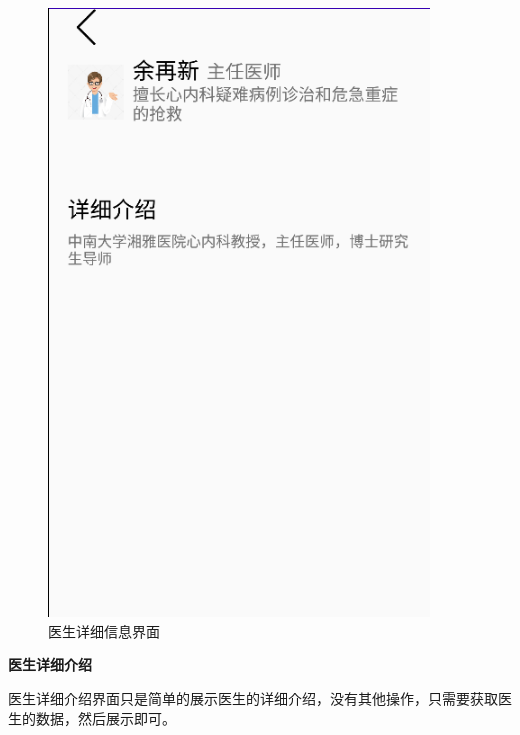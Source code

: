 \documentclass[UTF8,12pt]{article}
\begin{document}
\begin{figure}[htbp]
\begin{minipage}[t]{0.45\textwidth}
        \includegraphics[width=0.9\textwidth]{imgs/23.png}
        \caption{医生详细信息界面}
    \end{minipage}
\end{figure}

\newpage

\textbf{医生详细介绍}

医生详细介绍界面只是简单的展示医生的详细介绍，没有其他操作，只需要获取医生的数据，然后展示即可。
\end{document}
